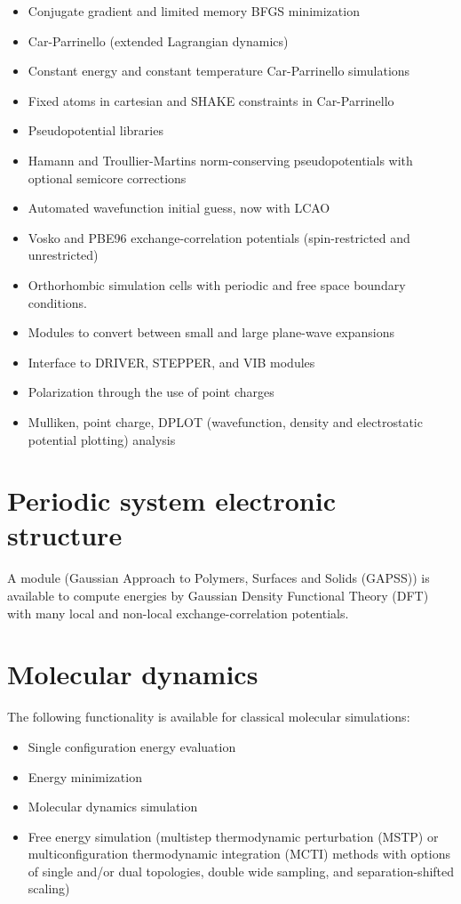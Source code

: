 \begin{itemize}
\item Conjugate gradient and limited memory BFGS minimization
\item Car-Parrinello (extended Lagrangian dynamics)
\item Constant energy and constant temperature Car-Parrinello simulations
\item Fixed atoms in cartesian and SHAKE constraints in Car-Parrinello
\item Pseudopotential libraries
\item Hamann and Troullier-Martins norm-conserving pseudopotentials with 
optional semicore corrections
\item Automated wavefunction initial guess, now with LCAO
\item Vosko and PBE96 exchange-correlation potentials (spin-restricted 
and unrestricted)
\item Orthorhombic simulation cells with periodic and
free space boundary conditions.
\item Modules to convert between small and large plane-wave expansions
\item Interface to DRIVER, STEPPER, and VIB modules
\item Polarization through the use of point charges
\item Mulliken, point charge, DPLOT (wavefunction, density and electrostatic
potential plotting) analysis
\end{itemize}

\section{Periodic system electronic structure}

A module  (Gaussian Approach to Polymers, Surfaces and Solids (GAPSS))
is available to compute energies by Gaussian Density
Functional Theory (DFT) with many local and non-local
exchange-correlation potentials.

\section{Molecular dynamics}

The following functionality is available for classical molecular
simulations:
\begin{itemize}
\item Single configuration energy evaluation
\item Energy minimization
\item Molecular dynamics simulation
\item Free energy simulation  (multistep thermodynamic perturbation (MSTP) or
    multiconfiguration thermodynamic integration (MCTI) methods with
    options of single and/or dual topologies, double wide sampling, and
    separation-shifted scaling)
\end{itemize}

